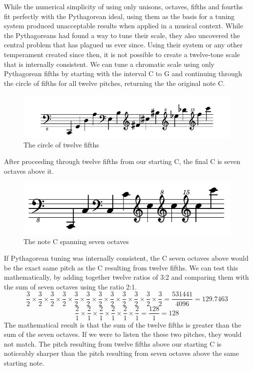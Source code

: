 While the numerical simplicity of using only unisons, octaves, fifths and fourths fit
perfectly with the Pythagorean ideal, using them as the basis for a tuning system produced
unacceptable results when applied in a musical context.  While the Pythagoreans had found
a way to tune their scale, they also uncovered the central problem that has plagued us ever
since.  Using their system or any other temperament created since then, it is not possible
to create a twelve-tone scale that is internally consistent.  We can tune a chromatic
scale using only Pythagorean fifths by starting with the interval C to G and continuing
through the circle of fifths for all twelve pitches, returning the the original note C.
\begin{figure}[h]
\centering
\includegraphics{examples/12-fifths.pdf}
\caption{The circle of twelve fifths}
\end{figure}
After proceeding through twelve fifths from our starting C, the final C is seven octaves
above it.
\begin{figure}[h]
\centering
\includegraphics{examples/7-octaves.pdf}
\caption{The note C spanning seven octaves}
\end{figure}
If Pythagorean tuning was internally consistent, the C seven octaves above would be the
exact same pitch as the C resulting from twelve fifths.  We can test this mathematically,
by adding together twelve ratios of 3:2 and comparing them with the sum of seven octaves
using the ratio 2:1.\autocite[25]{RD:1}
\begin{equation}
    \frac{3}{2} \times
    \frac{3}{2} \times
    \frac{3}{2} \times
    \frac{3}{2} \times
    \frac{3}{2} \times
    \frac{3}{2} \times
    \frac{3}{2} \times
    \frac{3}{2} \times
    \frac{3}{2} \times
    \frac{3}{2} \times
    \frac{3}{2} \times
    \frac{3}{2} = \frac{531441}{4096} = 129.7463
\end{equation}
\begin{equation}
    \frac{2}{1} \times
    \frac{2}{1} \times
    \frac{2}{1} \times
    \frac{2}{1} \times
    \frac{2}{1} \times
    \frac{2}{1} = \frac{128}{1} = 128
\end{equation}
The mathematical result is that the sum of the twelve fifths is greater than the sum of
the seven octaves.  If we were to listen the these two pitches, they would not match.
The pitch resulting from twelve fifths above our starting C is noticeably sharper than 
the pitch resulting from seven octaves above the same starting note.

